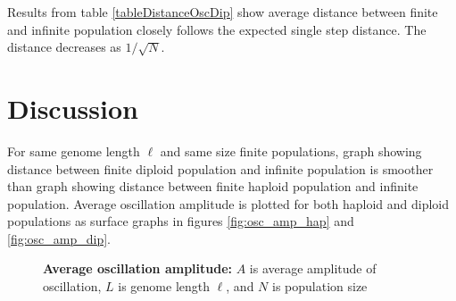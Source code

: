 Results from table \ref{tableDistanceOscDip} show average distance between finite and infinite population closely follows 
the expected single step distance. The distance decreases as $1/\sqrt{N}$.

\section{Discussion}
For same genome length $\ell$ and same size finite populations, graph showing distance between finite diploid population and infinite population is 
smoother than graph showing distance between finite haploid population and infinite population. Average oscillation amplitude is 
plotted for both haploid and diploid populations as surface graphs in figures \ref{fig:osc_amp_hap} and \ref{fig:osc_amp_dip}.

\begin{figure}[h]
\begin{center}
 \vspace{-0.5em} %

\caption{\textbf{Average oscillation amplitude:} $A$ is average amplitude of oscillation, $L$ is genome length $\ell$, and $N$ is population size}
\label{osc_amp}
\end{center}
\end{figure}

